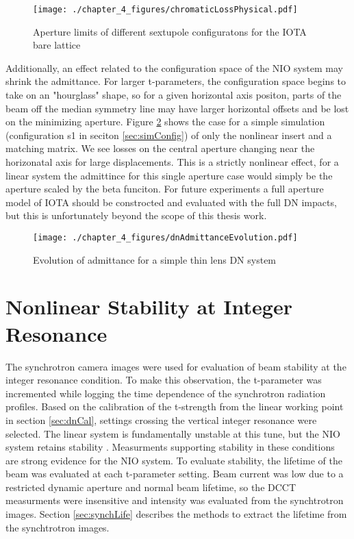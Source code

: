 \begin{figure}
	\centering
	\texttt{[image: ./chapter\_4\_figures/chromaticLossPhysical.pdf]}
	\caption{Aperture limits of different sextupole configuratons for the IOTA bare lattice}
	\label{fig:chromDA}
\end{figure}



Additionally, an effect related to the configuration space of the NIO system may shrink the admittance. For larger t-parameters, the configuration space begins to take on an "hourglass" shape, so for a given horizontal axis positon, parts of the beam off the median symmetry line may have larger horizontal offsets and be lost on the minimizing aperture. Figure \ref{fig:dnAdmitEvolve} shows the case for a simple simulation (configuration s1 in seciton \ref{sec:simConfig}) of only the nonlinear insert and a matching matrix. We see losses on the central aperture changing near the horizonatal axis for large displacements. This is a strictly nonlinear effect, for a linear system the admittince for this single aperture case would simply be the aperture scaled by the beta funciton. For future experiments a full aperture model of IOTA should be constrocted and evaluated with the full DN impacts, but this is unfortunately beyond the scope of this thesis work.

\begin{figure}
	\centering
	\texttt{[image: ./chapter\_4\_figures/dnAdmittanceEvolution.pdf]}
	\caption{Evolution of admittance for a simple thin lens DN system}
	\label{fig:dnAdmitEvolve}
\end{figure}


\section{Nonlinear Stability at Integer Resonance} \label{sec:intCross}
The synchrotron camera images were used for evaluation of beam stability at the integer resonance condition. To make this observation, the t-parameter was incremented while logging the time dependence of the synchrotron radiation profiles. Based on the calibration of the t-strength from the linear working point in section \ref{sec:dnCal}, settings crossing the vertical integer resonance were selected. The linear system is fundamentally unstable at this tune, but the NIO system retains stability . Measurments supporting stability in these conditions are strong evidence for the NIO system. To evaluate stability, the lifetime of the beam was evaluated at each t-parameter setting. Beam current was low due to a restricted dynamic aperture and normal beam lifetime, so the DCCT measurments were insensitive and intensity was evaluated from the synchtrotron images. Section \ref{sec:synchLife} describes the methods to extract the lifetime from the synchtrotron images.

